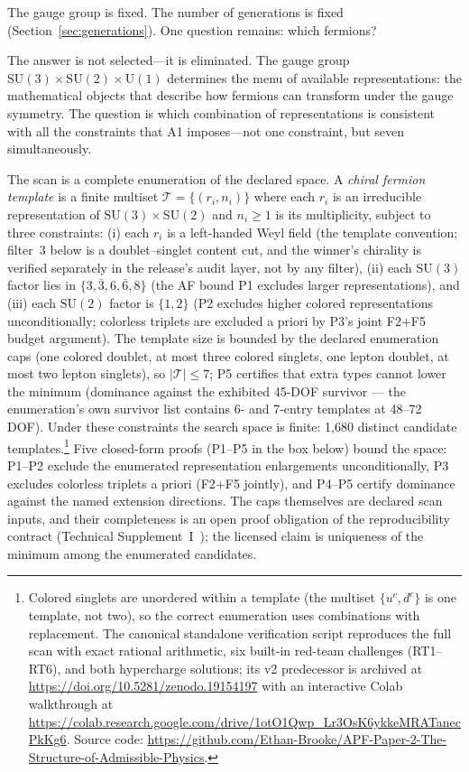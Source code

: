\documentclass[11pt]{article}
\newcommand{\SU}{\mathrm{SU}}
\newcommand{\U}{\mathrm{U}}
\begin{document}
The gauge group is fixed.  The number of generations is fixed (Section~\ref{sec:generations}).  One question remains: which fermions?

The answer is not selected---it is eliminated.  The gauge group $\SU(3) \times \SU(2) \times \U(1)$ determines the menu of available representations: the mathematical objects that describe how fermions can transform under the gauge symmetry.  The question is which combination of representations is consistent with all the constraints that A1 imposes---not one constraint, but seven simultaneously.

The scan is a complete enumeration of the declared space.  A \emph{chiral fermion template} is a finite multiset $\mathcal{T} = \{(r_i, n_i)\}$ where each $r_i$ is an irreducible representation of $\SU(3) \times \SU(2)$ and $n_i \ge 1$ is its multiplicity, subject to three constraints: (i) each $r_i$ is a left-handed Weyl field (the template convention; filter~3 below is a doublet--singlet content cut, and the winner's chirality is verified separately in the release's audit layer, not by any filter), (ii) each $\SU(3)$ factor lies in $\{3, \bar{3}, 6, \bar{6}, 8\}$ (the AF bound P1 excludes larger representations), and (iii) each $\SU(2)$ factor is $\{1, 2\}$ (P2 excludes higher colored representations unconditionally; colorless triplets are excluded a priori by P3's joint F2$+$F5 budget argument).  The template size is bounded by the declared enumeration caps (one colored doublet, at most three colored singlets, one lepton doublet, at most two lepton singlets), so $|\mathcal{T}| \le 7$; P5 certifies that extra types cannot lower the minimum (dominance against the exhibited 45-DOF survivor --- the enumeration's own survivor list contains 6- and 7-entry templates at 48--72 DOF).  Under these constraints the search space is finite: 1{,}680 distinct candidate templates.\footnote{Colored singlets are unordered within a template (the multiset $\{u^c, d^c\}$ is one template, not two), so the correct enumeration uses combinations with replacement.  The canonical standalone verification script reproduces the full scan with exact rational arithmetic, six built-in red-team challenges (RT1--RT6), and both hypercharge solutions; its v2 predecessor is archived at \url{https://doi.org/10.5281/zenodo.19154197} with an interactive Colab walkthrough at \url{https://colab.research.google.com/drive/1otO1Qwp_Lr3OsK6ykkeMRATanecPkKg6}.  Source code: \url{https://github.com/Ethan-Brooke/APF-Paper-2-The-Structure-of-Admissible-Physics}.}  Five closed-form proofs (P1--P5 in the box below) bound the space: P1--P2 exclude the enumerated representation enlargements unconditionally, P3 excludes colorless triplets a priori (F2$+$F5 jointly), and P4--P5 certify dominance against the named extension directions.  The caps themselves are declared scan inputs, and their completeness is an open proof obligation of the reproducibility contract (Technical Supplement~I~\cite{BrookeP2Supplement}); the licensed claim is uniqueness of the minimum among the enumerated candidates.
\end{document}
